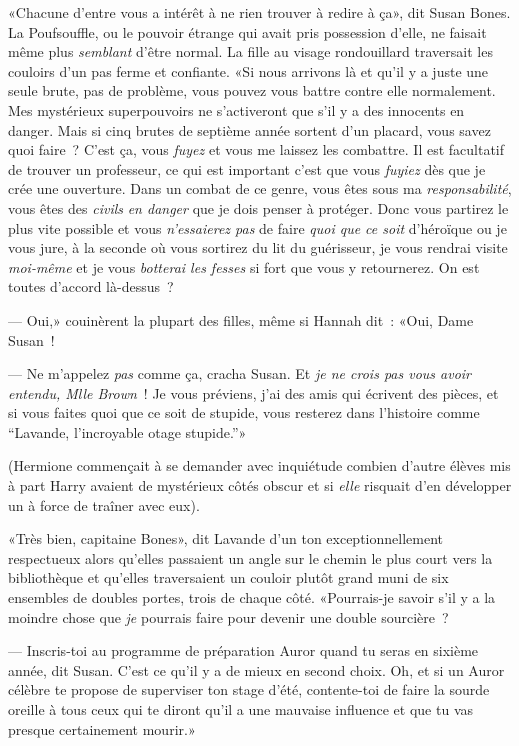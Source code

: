 «Chacune d'entre vous a intérêt à ne rien trouver à redire à ça», dit Susan Bones. La Poufsouffle, ou le pouvoir étrange qui avait pris possession d'elle, ne faisait même plus \emph{semblant} d'être normal. La fille au visage rondouillard traversait les couloirs d'un pas ferme et confiante. «Si nous arrivons là et qu'il y a juste une seule brute, pas de problème, vous pouvez vous battre contre elle normalement. Mes mystérieux superpouvoirs ne s'activeront que s'il y a des innocents en danger. Mais si cinq brutes de septième année sortent d'un placard, vous savez quoi faire~? C'est ça, vous \emph{fuyez} et vous me laissez les combattre. Il est facultatif de trouver un professeur, ce qui est important c'est que vous \emph{fuyiez} dès que je crée une ouverture. Dans un combat de ce genre, vous êtes sous ma \emph{responsabilité}, vous êtes des \emph{civils} \emph{en danger} que je dois penser à protéger. Donc vous partirez le plus vite possible et vous \emph{n'essaierez pas} de faire \emph{quoi que ce soit} d'héroïque ou je vous jure, à la seconde où vous sortirez du lit du guérisseur, je vous rendrai visite \emph{moi-même} et je vous \emph{botterai les fesses} si fort que vous y retournerez. On est toutes d'accord là-dessus~?

--- Oui,» couinèrent la plupart des filles, même si Hannah dit~: «Oui, Dame Susan~!

--- Ne m'appelez \emph{pas} comme ça, cracha Susan. Et \emph{je ne crois pas vous avoir entendu, Mlle Brown}~! Je vous préviens, j'ai des amis qui écrivent des pièces, et si vous faites quoi que ce soit de stupide, vous resterez dans l'histoire comme “Lavande, l'incroyable otage stupide.”»

(Hermione commençait à se demander avec inquiétude combien d'autre élèves mis à part Harry avaient de mystérieux côtés obscur et si \emph{elle} risquait d'en développer un à force de traîner avec eux).

«Très bien, capitaine Bones», dit Lavande d'un ton exceptionnellement respectueux alors qu'elles passaient un angle sur le chemin le plus court vers la bibliothèque et qu'elles traversaient un couloir plutôt grand muni de six ensembles de doubles portes, trois de chaque côté. «Pourrais-je savoir s'il y a la moindre chose que \emph{je} pourrais faire pour devenir une double sourcière~?

--- Inscris-toi au programme de préparation Auror quand tu seras en sixième année, dit Susan. C'est ce qu'il y a de mieux en second choix. Oh, et si un Auror célèbre te propose de superviser ton stage d'été, contente-toi de faire la sourde oreille à tous ceux qui te diront qu'il a une mauvaise influence et que tu vas presque certainement mourir.»

